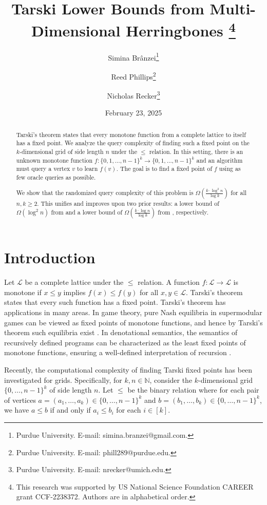 \documentclass[11pt]{article}
\title{Tarski Lower Bounds from Multi-Dimensional Herringbones \footnote{This research was supported by US National Science Foundation CAREER grant CCF-2238372. Authors are in alphabetical order.}}
\author{Simina Br\^anzei\footnote{Purdue University. E-mail: simina.branzei@gmail.com.} \and Reed Phillips\footnote{Purdue University. E-mail: phill289@purdue.edu.} \and Nicholas Recker\footnote{Purdue University. E-mail: nrecker@umich.edu.}}
\date{February 23, 2025}
\begin{document}
\maketitle 

\begin{abstract}
 Tarski's theorem  states that every monotone function from a  complete lattice to itself has a fixed point. 
We analyze the query complexity of finding such a fixed point on the 
$k$-dimensional grid of side length $n$ under the 
$\leq$ relation. In this setting, there is an unknown monotone function $f: \{0,1,\ldots, n-1\}^k \to \{0,1,\ldots, n-1\}^k$ and  an algorithm must query a vertex $v$ to learn  $f(v)$. The goal is to find a fixed point of $f$ using as few oracle queries as possible.

We show that the randomized query complexity of this problem is  $\Omega\left( \frac{k \cdot \log^2{n}}{\log{k}} \right)$ for all $n,k \geq 2$. This  unifies and improves upon two prior results: a lower bound of $\Omega(\log^2{n})$  from \cite{etessami2019tarski} and a lower bound of $\Omega\left( \frac{k \cdot \log{n}}{\log{k}}\right)$ from  \cite{BPR24}, respectively.
\end{abstract}

\section{Introduction}

Let $\mathcal{L}$ be a complete lattice under the $\leq$ relation. A function $f : \mathcal{L} \to \mathcal{L}$ is monotone if $x \leq y$ implies $f(x) \leq f(y)$ for all $x, y \in \mathcal{L}$. Tarski's theorem \cite{tarski1955lattice}  states that every such function has a fixed point.
Tarski's theorem has applications in many areas. In game theory, pure Nash equilibria in supermodular games can be viewed as fixed points of monotone functions, and hence by Tarski's theorem such equilibria exist \cite{etessami2019tarski}. In denotational semantics, the semantics of recursively defined programs can be characterized as the least fixed points of monotone functions, ensuring a well-defined interpretation of recursion \cite{Tarski_pl_note}.

Recently, the computational complexity of finding Tarski fixed points has been investigated for grids. Specifically, for $k,n \in \mathbb{N}$, consider the $k$-dimensional grid $\{0, \ldots, n-1\}^k$ of side length $n$. Let $\leq$ be the binary relation  where for each pair of vertices ${a} = (a_1, \ldots, a_k) \in \{0, \ldots, n-1\}^k$ and ${b} = (b_1, \ldots, b_k) \in \{0, \ldots, n-1\}^k$, we have  ${a} \leq {b}$ if and only if $a_i \leq b_i$ for each $i \in [k]$. 
\end{document}
